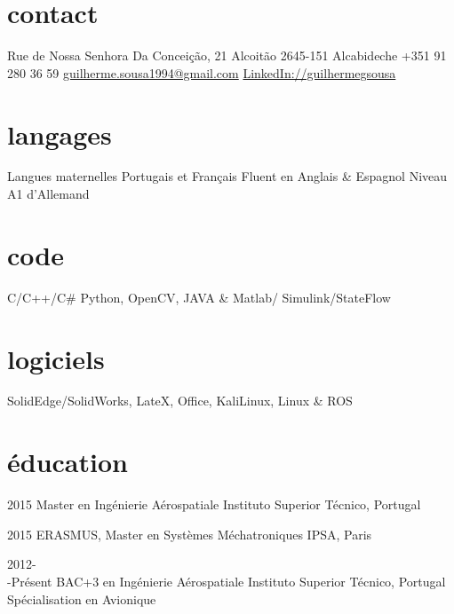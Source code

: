 \documentclass[]{friggeri-cv} %
\begin{document}


\begin{aside} %
\section{contact}
Rue de Nossa Senhora Da Conceição, 21
Alcoitão
2645-151 Alcabideche\newline
+351 91 280 36 59
\href{mailto:guilherme.sousa1994@gmail.com}{guilherme.sousa1994\newline @gmail.com}
\href{https://www.linkedin.com/in/guilhermegsousa}{LinkedIn://guilhermegsousa}
\section{langages}
Langues maternelles Portugais et Français 
Fluent en Anglais \& Espagnol
Niveau A1 d'Allemand
\section{code}
C/C++/C\#
Python, OpenCV,
JAVA \& Matlab/ Simulink/StateFlow
\section{logiciels}
SolidEdge/SolidWorks,
LateX, Office, KaliLinux,
Linux \& ROS
\end{aside}


\section{éducation}

\begin{entrylist}


\entry
{2015}
{Master {\normalfont en Ingénierie Aérospatiale}}
{Instituto Superior Técnico, Portugal}
{\emph{} \\ }%


\entry
{2015}
{ERASMUS, Master {\normalfont en Systèmes Méchatroniques} }
{IPSA, Paris}
{\emph{} \\ }

\entry
{2012-\\-Présent}
{BAC+3 {\normalfont en Ingénierie Aérospatiale}}
{Instituto Superior Técnico, Portugal}
{Spécialisation en Avionique}


\end{entrylist}
\end{document}
